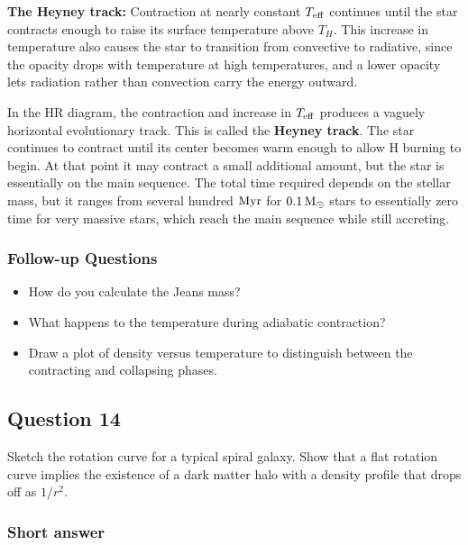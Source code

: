 \documentclass[a4paper,10pt]{article}
\begin{document}
{\noindent}\textbf{The Heyney track:} Contraction at nearly constant $T_{\rm eff}$ continues until the star contracts enough to raise its surface temperature above $T_H$. This increase in temperature also causes the star to transition from convective to radiative, since the opacity drops with temperature at high temperatures, and a lower opacity lets radiation rather than convection carry the energy outward.

{\noindent}In the HR diagram, the contraction and increase in $T_{\rm eff}$ produces a vaguely horizontal evolutionary track. This is called the \textbf{Heyney track}. The star continues to contract until its center becomes warm enough to allow H burning to begin. At that point it may contract a small additional amount, but the star is essentially on the main sequence. The total time required depends on the stellar mass, but it ranges from several hundred ${\rm Myr}$ for $0.1\,{\rm M_\odot}$ stars to essentially zero time for very massive stars, which reach the main sequence while still accreting.

\subsubsection{Follow-up Questions}

\begin{itemize}
    \item How do you calculate the Jeans mass?
    \item What happens to the temperature during adiabatic contraction?
    \item Draw a plot of density versus temperature to distinguish between the contracting and collapsing phases.
\end{itemize}


\newpage
\subsection{Question 14}

Sketch the rotation curve for a typical spiral galaxy. Show that a flat rotation curve implies the existence of a dark matter halo with a density profile that drops off as $1/r^2$.

\subsubsection{Short answer}
\end{document}
